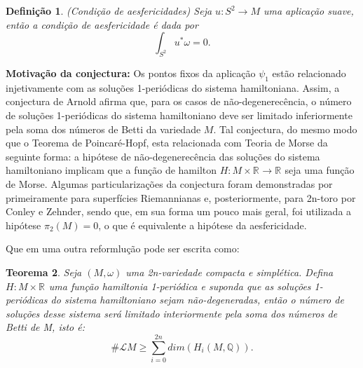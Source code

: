 \documentclass[12pt]{book}
\newtheorem{teorema}{Teorema}[section]
\newtheorem{definicao}[teorema]{Definição}
\newcommand{\real}[1]{\mathbb{R}^{#1}}
\newcommand{\solucoesperiodicascontrateis}{\mathcal{L}M}
\begin{document}
	\begin{definicao}
		(Condição de aesfericidades) Seja $u:S^{2} \to M$ uma aplicação suave, então a condição de aesfericidade é dada por 
		$$
		\int_{S^{2}} u^{*}\omega = 0.
		$$
	\end{definicao}
	
	\textbf{Motivação da conjectura:} Os pontos fixos da aplicação $\psi_{1}$ estão relacionado injetivamente com as soluções 1-periódicas do sistema hamiltoniana. Assim, a conjectura de Arnold afirma que, para os casos de não-degenerecência, o número de soluções 1-periódicas do sistema hamiltoniano deve ser limitado inferiormente pela soma dos números de Betti da variedade $M$. Tal conjectura, do mesmo modo que o Teorema de Poincaré-Hopf, esta relacionada com Teoria de Morse da seguinte forma: a hipótese de não-degenerecência das soluções do sistema hamiltoniano implicam que a função de hamilton $H: M \times \real{} \to \real{}$ seja uma função de Morse. Algumas particularizações da conjectura foram demonstradas por primeiramente para superfícies Riemannianas e, posteriormente, para 2n-toro por Conley e Zehnder, sendo que, em sua forma um pouco mais geral, foi utilizada a hipótese $\pi_{2}(M)=0$, o que é equivalente a hipótese da aesfericidade.

	Que em uma outra reformlução pode ser escrita como:
	
	\begin{teorema}
		Seja $(M,\omega)$ uma 2n-variedade compacta e simplética. Defina $H:M\times \real{}$ uma função hamiltonia 1-periódica e suponda que as soluções 1-periódicas do sistema hamiltoniano sejam não-degeneradas, então o número de soluções desse sistema será limitado interiormente pela soma dos números de Betti de M, isto é:
		$$
		\#\solucoesperiodicascontrateis \geq \sum_{i=0}^{2n}dim(H_{i}(M, \mathbb{Q})).
		$$
	\end{teorema}
	
\end{document}
